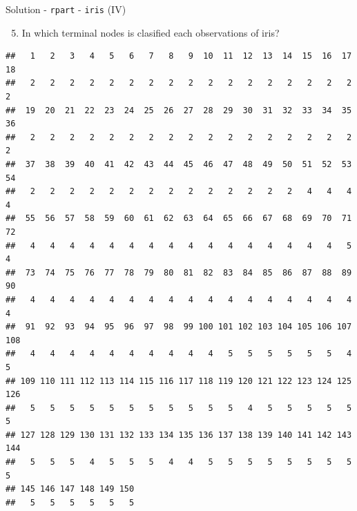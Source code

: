 \documentclass[
  10pt,
  ignorenonframetext,
]{beamer}
\newenvironment{Shaded}{}{}
\newcommand{\NormalTok}[1]{#1}
\newcommand{\OperatorTok}[1]{#1}
\providecommand{\tightlist}{%
  \setlength{\itemsep}{0pt}\setlength{\parskip}{0pt}}
\begin{document}
\begin{frame}[fragile]{Solution - \texttt{rpart} - \texttt{iris} (IV)}
\protect\hypertarget{solution---rpart---iris-iv}{}

\begin{enumerate}
[1)]
\setcounter{enumi}{4}
\tightlist
\item
  In which terminal nodes is clasified each observations of iris?
\end{enumerate}

\begin{Shaded}
\end{Shaded}

\begin{verbatim}
##   1   2   3   4   5   6   7   8   9  10  11  12  13  14  15  16  17  18 
##   2   2   2   2   2   2   2   2   2   2   2   2   2   2   2   2   2   2 
##  19  20  21  22  23  24  25  26  27  28  29  30  31  32  33  34  35  36 
##   2   2   2   2   2   2   2   2   2   2   2   2   2   2   2   2   2   2 
##  37  38  39  40  41  42  43  44  45  46  47  48  49  50  51  52  53  54 
##   2   2   2   2   2   2   2   2   2   2   2   2   2   2   4   4   4   4 
##  55  56  57  58  59  60  61  62  63  64  65  66  67  68  69  70  71  72 
##   4   4   4   4   4   4   4   4   4   4   4   4   4   4   4   4   5   4 
##  73  74  75  76  77  78  79  80  81  82  83  84  85  86  87  88  89  90 
##   4   4   4   4   4   4   4   4   4   4   4   4   4   4   4   4   4   4 
##  91  92  93  94  95  96  97  98  99 100 101 102 103 104 105 106 107 108 
##   4   4   4   4   4   4   4   4   4   4   5   5   5   5   5   5   4   5 
## 109 110 111 112 113 114 115 116 117 118 119 120 121 122 123 124 125 126 
##   5   5   5   5   5   5   5   5   5   5   5   4   5   5   5   5   5   5 
## 127 128 129 130 131 132 133 134 135 136 137 138 139 140 141 142 143 144 
##   5   5   5   4   5   5   5   4   4   5   5   5   5   5   5   5   5   5 
## 145 146 147 148 149 150 
##   5   5   5   5   5   5
\end{verbatim}

\end{frame}
\end{document}
